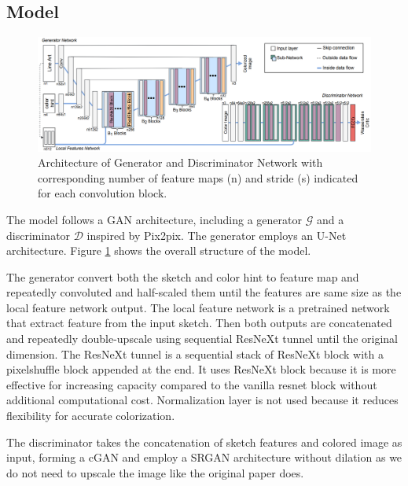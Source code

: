 \subsection{Model}


\begin{figure}
    \centering
    \includegraphics[width=1.0\textwidth]{images/colorization/alacgan_arch.png}
    \caption{Architecture of Generator and Discriminator Network with corresponding number of feature maps (n) and stride (s) indicated for each convolution block.} 
    \label{fig:alacgan_arch}
\end{figure}

The model follows a GAN architecture, including a generator $\mathcal{G}$ and a discriminator $\mathcal{D}$ inspired by Pix2pix. The generator employs an U-Net\cite{ronnebergerUNetConvolutionalNetworks2015} architecture. Figure \ref{fig:alacgan_arch} shows the overall structure of the model.


The generator convert both the sketch and color hint to feature map and repeatedly convoluted and half-scaled them until the features are same size as the local feature network output. The local feature network is a pretrained network that extract feature from the input sketch. Then both outputs are concatenated and repeatedly double-upscale using sequential ResNeXt tunnel until the original dimension. The ResNeXt tunnel is a sequential stack of ResNeXt block\cite{xieAggregatedResidualTransformations2017a} with a pixelshuffle block\cite{shiRealTimeSingleImage2016} appended at the end. It uses ResNeXt block because it is more effective for increasing capacity compared to the vanilla resnet block without additional computational cost. Normalization layer is not used because it reduces flexibility for accurate colorization\cite{nahDeepMultiscaleConvolutional2018}.

The discriminator takes the concatenation of sketch features and colored image as input, forming a cGAN\cite{mirzaConditionalGenerativeAdversarial2014} and employ a SRGAN\cite{ledigPhotoRealisticSingleImage2017} architecture without dilation as we do not need to upscale the image like the original paper does.

